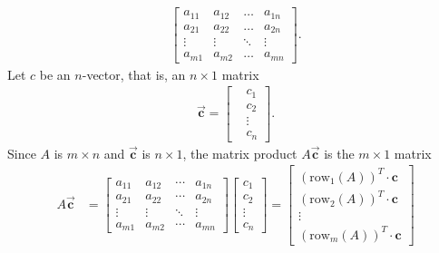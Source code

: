 \documentclass{report}
\begin{document}
\begin{itemize}
\begin{align*}
\begin{bmatrix}
                        a_{11}& a_{12} & \ldots & a_{1n} \\
                        a_{21}& a_{22} & \ldots & a_{2n} \\
                        \vdots & \vdots & \ddots &\vdots \\
                        a_{m1} & a_{m2} & \ldots & a_{mn}
                    \end{bmatrix}
                .\end{align*}
                Let $c$ be an $n$-vector, that is, an $n\times 1$ matrix
                \begin{align*}
                    \vec{\mathbf{c}} = \begin{bmatrix}
                        &c_{1}  \\ &c_{2} \\ &\vdots \\ &c_{n}
                    \end{bmatrix}
                .\end{align*}
                Since $A$ is $m\times n$ and $\vec{\mathbf{c}}$ is $n\times 1 $, the matrix product $A\vec{\mathbf{c}}$ is the $m\times 1$ matrix
                \bigbreak \noindent 
                \begin{align*}
                    A\vec{\mathbf{c}}&= \begin{bmatrix}
                    a_{11} & a_{12} & \cdots & a_{1n} \\
                    a_{21} & a_{22} & \cdots & a_{2n} \\
                    \vdots & \vdots & \ddots & \vdots \\
                    a_{m1} & a_{m2} & \cdots & a_{mn}
                \end{bmatrix}
                \begin{bmatrix}
                    c_1 \\
                    c_2 \\
                    \vdots \\
                    c_n
                \end{bmatrix}
                = 
                \begin{bmatrix}
                    (\text{row}_1(A))^T \cdot \mathbf{c} \\
                    (\text{row}_2(A))^T \cdot \mathbf{c} \\
                    \vdots \\
                    (\text{row}_m(A))^T \cdot \mathbf{c} 

\end{bmatrix}
\end{align*}
\end{itemize}
\end{document}
